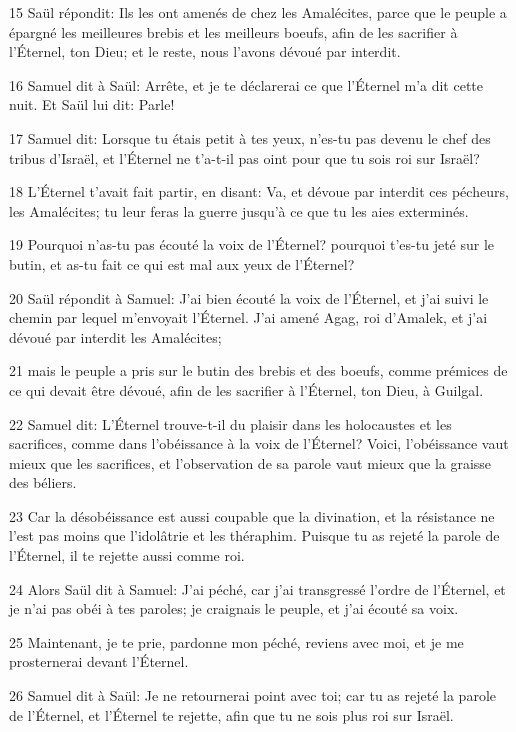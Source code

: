 \par 15 Saül répondit: Ils les ont amenés de chez les Amalécites, parce que le peuple a épargné les meilleures brebis et les meilleurs boeufs, afin de les sacrifier à l'Éternel, ton Dieu; et le reste, nous l'avons dévoué par interdit.
\par 16 Samuel dit à Saül: Arrête, et je te déclarerai ce que l'Éternel m'a dit cette nuit. Et Saül lui dit: Parle!
\par 17 Samuel dit: Lorsque tu étais petit à tes yeux, n'es-tu pas devenu le chef des tribus d'Israël, et l'Éternel ne t'a-t-il pas oint pour que tu sois roi sur Israël?
\par 18 L'Éternel t'avait fait partir, en disant: Va, et dévoue par interdit ces pécheurs, les Amalécites; tu leur feras la guerre jusqu'à ce que tu les aies exterminés.
\par 19 Pourquoi n'as-tu pas écouté la voix de l'Éternel? pourquoi t'es-tu jeté sur le butin, et as-tu fait ce qui est mal aux yeux de l'Éternel?
\par 20 Saül répondit à Samuel: J'ai bien écouté la voix de l'Éternel, et j'ai suivi le chemin par lequel m'envoyait l'Éternel. J'ai amené Agag, roi d'Amalek, et j'ai dévoué par interdit les Amalécites;
\par 21 mais le peuple a pris sur le butin des brebis et des boeufs, comme prémices de ce qui devait être dévoué, afin de les sacrifier à l'Éternel, ton Dieu, à Guilgal.
\par 22 Samuel dit: L'Éternel trouve-t-il du plaisir dans les holocaustes et les sacrifices, comme dans l'obéissance à la voix de l'Éternel? Voici, l'obéissance vaut mieux que les sacrifices, et l'observation de sa parole vaut mieux que la graisse des béliers.
\par 23 Car la désobéissance est aussi coupable que la divination, et la résistance ne l'est pas moins que l'idolâtrie et les théraphim. Puisque tu as rejeté la parole de l'Éternel, il te rejette aussi comme roi.
\par 24 Alors Saül dit à Samuel: J'ai péché, car j'ai transgressé l'ordre de l'Éternel, et je n'ai pas obéi à tes paroles; je craignais le peuple, et j'ai écouté sa voix.
\par 25 Maintenant, je te prie, pardonne mon péché, reviens avec moi, et je me prosternerai devant l'Éternel.
\par 26 Samuel dit à Saül: Je ne retournerai point avec toi; car tu as rejeté la parole de l'Éternel, et l'Éternel te rejette, afin que tu ne sois plus roi sur Israël.
